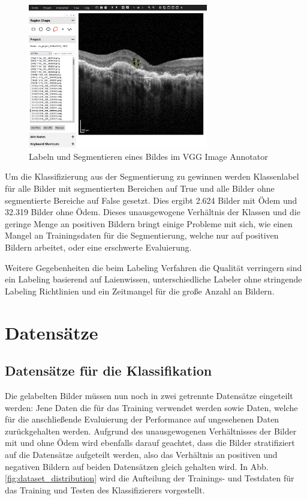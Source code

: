 \begin{figure}[H]
\centering
\includegraphics[width=0.7\textwidth]{./pic/Datenvorverarbeitung/VGG.png}
\caption{\label{fig:vgg}Labeln und Segmentieren eines Bildes im VGG Image Annotator}
\end{figure}

Um die Klassifizierung aus der Segmentierung zu gewinnen werden Klassenlabel für alle Bilder mit segmentierten Bereichen auf True und alle Bilder ohne segmentierte Bereiche auf False gesetzt. Dies ergibt 2.624 Bilder mit Ödem und 32.319 Bilder ohne Ödem. Dieses unausgewogene Verhältnis der Klassen und die geringe Menge an positiven Bildern bringt einige Probleme mit sich, wie einen Mangel an Trainingsdaten für die Segmentierung, welche nur auf positiven Bildern arbeitet, oder eine erschwerte Evaluierung.

Weitere Gegebenheiten die beim Labeling Verfahren die Qualität verringern sind ein Labeling basierend auf Laienwissen, unterschiedliche Labeler ohne stringende Labeling Richtlinien und ein Zeitmangel für die große Anzahl an Bildern.

\section{Datensätze}

\subsection{Datensätze für die Klassifikation}
Die gelabelten Bilder müssen nun noch in zwei getrennte Datensätze eingeteilt werden: Jene Daten die für das Training verwendet werden sowie Daten, welche für die anschließende Evaluierung der Performance auf ungesehenen Daten zurückgehalten werden. Aufgrund des unausgewogenen Verhältnisses der Bilder mit und ohne Ödem wird ebenfalls darauf geachtet, dass die Bilder stratifiziert auf die Datensätze aufgeteilt werden, also das Verhältnis an positiven und negativen Bildern auf beiden Datensätzen gleich gehalten wird. In Abb. \ref{fig:dataset_distribution} wird die Aufteilung der Trainings- und Testdaten für das Training und Testen des Klassifizierers vorgestellt.

